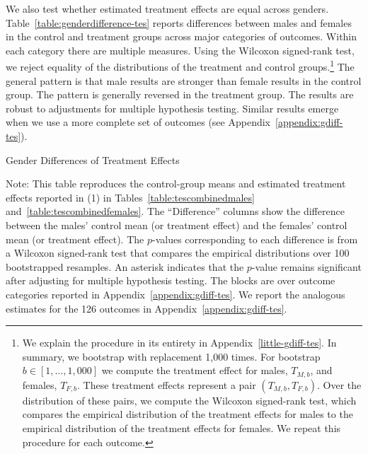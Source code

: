 We also test whether estimated treatment effects are equal across genders. Table~\ref{table:genderdifference-tes} reports differences between males and females in the control and treatment groups across major categories of outcomes. Within each category there are multiple measures. Using the Wilcoxon signed-rank test, we reject equality of the distributions of the treatment and control groups.\footnote{We explain the procedure in its entirety in Appendix~\ref{little-gdiff-tes}. In summary, we bootstrap with replacement 1,000 times. For bootstrap $b \in [1, \ldots, 1,000]$ we compute the treatment effect for males, $T_{M,b}$, and females, $T_{F,b}$. These treatment effects represent a pair $(T_{M,b}, T_{F,b})$. Over the distribution of these pairs, we compute the Wilcoxon signed-rank test, which compares the empirical distribution of the treatment effects for males to the empirical distribution of the treatment effects for females. We repeat this procedure for each outcome.} The general pattern is that male results are stronger than female results in the control group. The pattern is generally reversed in the treatment group. The results are robust to adjustments for multiple hypothesis testing. Similar results emerge when we use a more complete set of outcomes (see Appendix~\ref{appendix:gdiff-tes}).

\begin{table}
\centering
\begin{threeparttable}
\caption{Gender Differences of Treatment Effects}\label{table:genderdifference-tes}
\begin{scriptsize}

\end{scriptsize}
\begin{tablenotes}
\scriptsize
Note: This table reproduces the control-group means and estimated treatment effects reported in (1) in Tables~\ref{table:tescombinedmales} and~\ref{table:tescombinedfemales}. The ``Difference'' columns show the difference between the males' control mean (or treatment effect) and the females' control mean (or treatment effect). The $p$-values corresponding to each difference is from a Wilcoxon signed-rank test that compares the empirical distributions over 100 bootstrapped resamples. An asterisk indicates that the $p$-value remains significant after adjusting for multiple hypothesis testing. The blocks are over outcome categories reported in Appendix~\ref{appendix:gdiff-tes}. We report the analogous estimates for the 126 outcomes in Appendix~\ref{appendix:gdiff-tes}.
\end{tablenotes}
\end{threeparttable}
\end{table}

